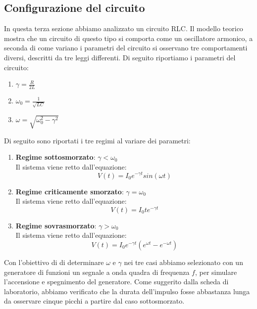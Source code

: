 \documentclass[letterpaper,12pt]{article}
\begin{document}
\subsection{Configurazione del circuito}
In questa terza sezione abbiamo analizzato un circuito RLC. Il modello teorico mostra che un circuito di questo tipo si comporta come un oscillatore armonico, a seconda di come variano i parametri del circuito si osservano tre comportamenti diversi, descritti da tre leggi differenti. Di seguito riportiamo i parametri del circuito:
\begin{enumerate}
    \item $\gamma = \frac{R}{2L}$
    \item $\omega_0 = \frac{1}{\sqrt{LC}}$
    \item $\omega = \sqrt{\omega_0^2 - \gamma^2}$
\end{enumerate}
Di seguito sono riportati i tre regimi al variare dei parametri:
\begin{enumerate}
    \item \textbf{Regime sottosmorzato}: $\gamma < \omega_0$\\
            Il sistema viene retto dall'equazione:
            \begin{equation}
                V(t) = I_0e^{-\gamma t} sin(\omega t)                
            \end{equation}

    \item \textbf{Regime criticamente smorzato}: $\gamma = \omega_0$\\
            Il sistema viene retto dall'equazione:
            \begin{equation}
                V(t) = I_0 t e^{-\gamma t}                
            \end{equation}
            
    \item \textbf{Regime sovrasmorzato}: $\gamma > \omega_0$\\
            Il sistema viene retto dall'equazione:
            \begin{equation}
                V(t) = I_0 e^{-\gamma t} (e^{\omega t} - e^{-\omega t})              
            \end{equation}
\end{enumerate}
Con l'obiettivo di di determinare $\omega$ e $\gamma$ nei tre casi abbiamo selezionato con un generatore di funzioni un segnale a onda quadra di frequenza $f$, per simulare l'accensione e spegnimento del generatore. Come suggerito dalla scheda di laboratorio, abbiamo verificato che la durata dell'impulso fosse abbastanza lunga da osservare cinque picchi a partire dal caso sottosmorzato.
\end{document}
